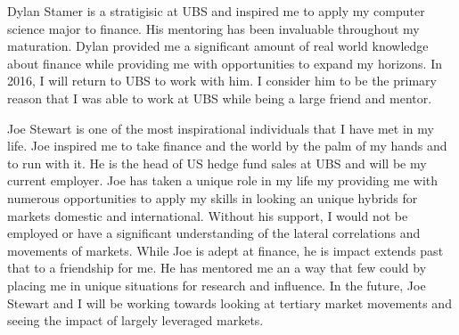 \documentclass[paper=letter, fontsize=11pt]{scrartcl}
\numberwithin{equation}{section}		%
\numberwithin{figure}{section}			%
\numberwithin{table}{section}				%
\begin{document}
\begin{spacing}{2}
Dylan Stamer is a stratigisic at UBS and inspired me to apply my computer science major to finance. His mentoring has been invaluable throughout my maturation. Dylan provided me a significant amount of real world knowledge  about finance while providing me with opportunities to expand my horizons. In 2016, I will return to UBS to work with him. I consider him to be the primary reason that I was able to work at UBS while being a large friend and mentor. 

Joe Stewart is one of the most inspirational individuals that I have met in my life. Joe inspired me to take finance and the world by the palm of my hands and to run with it. He is the head of US hedge fund sales at UBS and will be my current employer. Joe has taken a unique role in my life my providing me with numerous opportunities to apply my skills in looking an unique hybrids for markets domestic and international. Without his support, I would not be employed or have a significant understanding of the lateral correlations and movements of markets. While Joe is adept at finance, he is impact extends past that to a friendship for me. He has mentored me an a way that few could by placing me in unique situations for research and influence. In the future, Joe Stewart and I will be working towards looking at tertiary market movements and seeing the impact of largely leveraged markets. 


\end{spacing}
\end{document}
